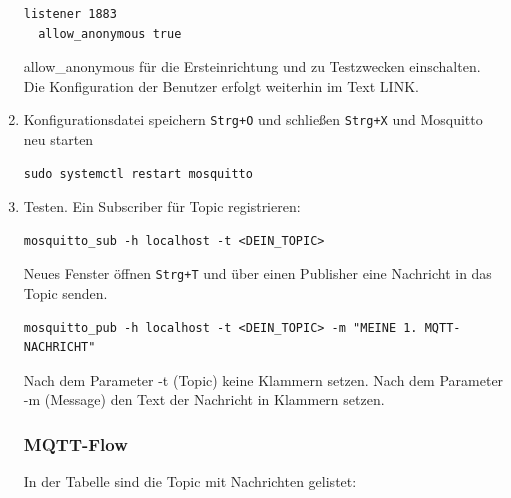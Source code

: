 \documentclass[12pt, letterpaper]{article}
\begin{document}
\begin{enumerate}
\begin{Verbatim}[frame=single]
  listener 1883
  allow_anonymous true
\end{Verbatim}
\par allow\_anonymous für die Ersteinrichtung und zu Testzwecken einschalten. Die Konfiguration der Benutzer erfolgt weiterhin im Text LINK.
\item Konfigurationsdatei speichern \texttt{Strg+O} und schließen \texttt{Strg+X} und Mosquitto neu starten 
\begin{Verbatim}[frame=single]
  sudo systemctl restart mosquitto
\end{Verbatim}
  \item Testen. Ein Subscriber für Topic registrieren: 
\begin{Verbatim}[frame=single]
  mosquitto_sub -h localhost -t <DEIN_TOPIC>
\end{Verbatim}
\par Neues Fenster öffnen \texttt{Strg+T} und über einen Publisher eine Nachricht in das Topic senden.
\begin{Verbatim}[frame=single]
  mosquitto_pub -h localhost -t <DEIN_TOPIC> -m "MEINE 1. MQTT-NACHRICHT"
\end{Verbatim}
\par Nach dem Parameter -t (Topic) keine Klammern setzen. Nach dem Parameter -m (Message) den Text der Nachricht in Klammern setzen.
\subsubsection{MQTT-Flow}
\par In der Tabelle sind die Topic mit Nachrichten gelistet:
\end{enumerate}
\end{document}
